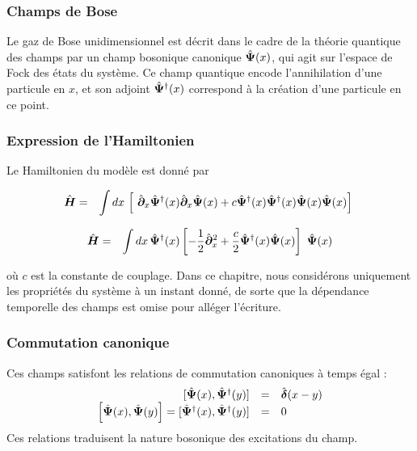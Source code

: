 \subsubsection{Champs de Bose}

Le gaz de Bose unidimensionnel est décrit dans le cadre de la théorie quantique des champs par un champ bosonique canonique \( \hat{\bm{\Psi}}(x) \), qui agit sur l’espace de Fock des états du système. Ce champ quantique encode l’annihilation d’une particule en \( x \), et son adjoint \( \hat{\bm{\Psi}}^\dag(x) \) correspond à la création d’une particule en ce point. 


\subsubsection{Expression de l’Hamiltonien}
Le Hamiltonien du modèle est donné par

\begin{eqnarray}
	\operator{H} & = & \int dx \, \left [ \operator{\partial}_x \operator{\Psi}^\dag (x)\operator{\partial}_x \operator{\Psi}(x) + c \operator{\Psi}^\dag (x) \operator{\Psi}^\dag (x) \operator{\Psi} (x) \operator{\Psi} (x) \right ] \label{chap:1:ham.mod}
\end{eqnarray}

\begin{eqnarray}
	\operator{H} & = & \int dx \, \operator{\Psi}^\dag (x)\left [-\frac{1}{2}\operator{\partial}_x^2 + \frac{c}{2}  \operator{\Psi}^\dag (x) \operator{\Psi} (x) \right ] \operator{\Psi} (x) \label{chap:1:ham.mod}
\end{eqnarray}


où \( c \) est la constante de couplage. Dans ce chapitre, nous considérons uniquement les propriétés du système à un instant donné, de sorte que la dépendance temporelle des champs est omise pour alléger l’écriture.

\subsubsection{Commutation canonique}
Ces champs satisfont les relations de commutation canoniques à temps égal :
\begin{eqnarray}
	\left . \begin{array}{rcl}
		[ \hat{\bm{\Psi}}(x),  \hat{\bm{\Psi}}^\dagger(y) ]  &=&  \hat{\bm{\delta}}(x - y) \\
		\left [ \hat{\bm{\Psi}}(x),  \hat{\bm{\Psi}}(y) \right ]   =  [ \hat{\bm{\Psi}}^\dag(x),  \hat{\bm{\Psi}}^\dag(y) ]  &=&  0 
	\end{array} \right . \label{chap:1:com.1}
\end{eqnarray}
Ces relations traduisent la nature bosonique des excitations du champ.


